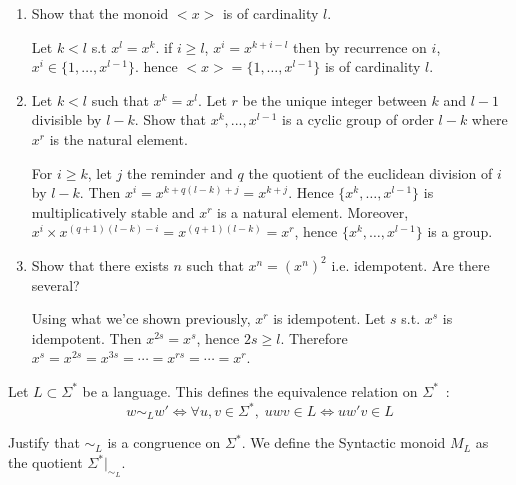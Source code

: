 \documentclass[a4paper,11pt]{exam}
\begin{document}
\begin{questions}
\begin{enumerate}
\begin{enumerate}
        \item Show that the monoid $<x>$ is of cardinality $l$.

          \begin{solution}
            Let $k<l$ s.t $x^l=x^k$.
            if $i \geq l$, $x^i=x^{k+i-l}$ then by recurrence on $i$,
            $x^i \in \{1, \dots, x^{l-1} \}$.
            hence $<x>=\{1, \dots, x^{l-1} \}$ is of cardinality $l$.
          \end{solution}

        \item Let $k<l$ such that $x^k = x^l$. Let $r$ be the unique integer between $k$ and $l-1$ divisible by $l-k$.
        Show that $x^k,...,x^{l-1}$ is a cyclic group of order $l-k$ where $x^r$ is the natural element.

          \begin{solution}
            For $i \geq k$, let $j$ the reminder and  $q$ the quotient of the euclidean division of $i$ by $l-k$.
            Then $x^i = x^{k+q(l-k)+j} = x^{k+j}$.
            Hence $\{x^k, \dots, x^{l-1}\}$ is multiplicatively stable and
            $x^r$ is a natural element.
            Moreover, $x^i \times x^{(q+1)(l-k)-i}=x^{(q+1)(l-k)}=x^r$, hence 
            $\{x^k, \dots, x^{l-1}\}$ is a group.
          \end{solution}

        \item Show that there exists $n$ such that $x^n=(x^n)^2$ i.e. idempotent. Are there several?

          \begin{solution}
            Using what we'ce shown previously, $x^r$ is idempotent.
            Let $s$ s.t. $x^s$ is idempotent. Then $x^{2s}=x^s$, hence $2s \geq l$.
            Therefore $x^s=x^{2s}=x^{3s}=\cdots=x^{rs}=\cdots=x^r$.
          \end{solution}
      \end{enumerate}
  \end{enumerate}
  Let $L \subset \Sigma^*$ be a language. This defines the equivalence relation on $\Sigma^*$~:
  \[
    w \sim_L w' \Leftrightarrow \forall u, v\in \Sigma^*, \; uwv\in L
    \Leftrightarrow uw'v\in L
  \]

  Justify that $\sim_L $ is a congruence on $\Sigma^*$.
  We define the Syntactic monoid $M_L$ as the quotient 
  $\Sigma^*|_{\sim_L}$.


\end{questions}
\end{document}
